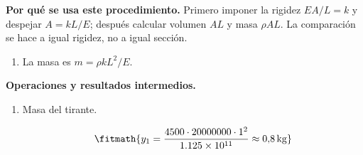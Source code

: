 \noindent\textbf{Por qué se usa este procedimiento.} Primero imponer la rigidez $EA/L=k$ y despejar $A=kL/E$; después calcular volumen $AL$ y masa $\rho AL$. La comparación se hace a igual rigidez, no a igual sección.

\begin{enumerate}

\item La masa es $m = \rho k L^2/E$.

\end{enumerate}

\noindent\textbf{Operaciones y resultados intermedios.}

\begin{enumerate}

\item Masa del tirante.

\[\fitmath{y_{1}=\frac{4500\cdot 20000000\cdot {1}^{2}}{1.125\times10^{11}}\approx 0{,}8\,\mathrm{kg}}\]

\end{enumerate}
